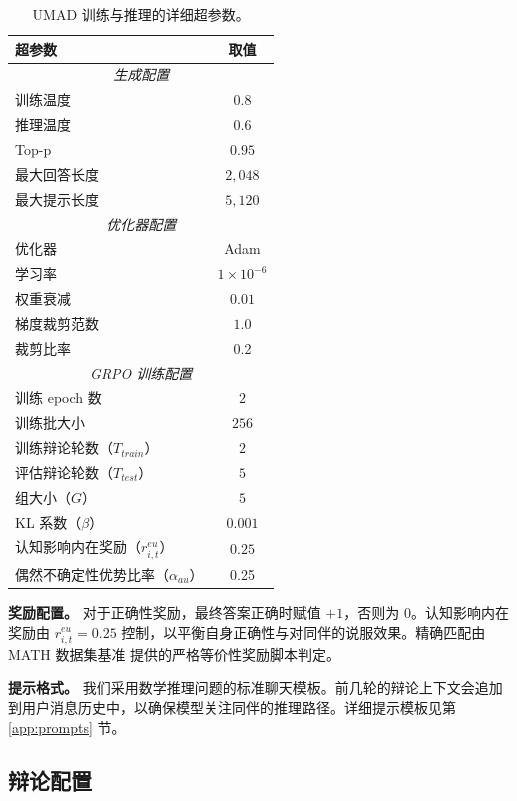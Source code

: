 \documentclass{article}
\theoremstyle{plain}
\theoremstyle{definition}
\theoremstyle{remark}
\begin{document}
\begin{table}[h]
\centering
\caption{UMAD 训练与推理的详细超参数。}
\label{tab:hyperparameters}
\begin{small}
\begin{tabular}{l|c}
\toprule
\textbf{超参数} & \textbf{取值} \\
\midrule
\multicolumn{2}{c}{\textit{生成配置}} \\
\midrule
训练温度 & $0.8$ \\
推理温度 & $0.6$ \\
Top-p & $0.95$ \\
最大回答长度 & $2,048$ \\
最大提示长度 & $5,120$ \\
\midrule
\multicolumn{2}{c}{\textit{优化器配置}} \\
\midrule
优化器 & Adam \\
学习率 & $1 \times 10^{-6}$ \\
权重衰减 & $0.01$ \\
梯度裁剪范数 & $1.0$ \\
裁剪比率 & 0.2 \\
\midrule
\multicolumn{2}{c}{\textit{GRPO 训练配置}} \\
\midrule
训练 epoch 数 & $2$ \\
训练批大小 & $256$ \\
训练辩论轮数（$T_{train}$） & $2$ \\
评估辩论轮数（$T_{test}$） & $5$ \\
组大小（$G$） & $5$ \\
KL 系数（$\beta$） & $0.001$ \\
认知影响内在奖励（$r_{i,t}^{eu}$） & $0.25$ \\
偶然不确定性优势比率（$\alpha_{au}$） & 0.25 \\
\bottomrule
\end{tabular}
\end{small}
\end{table}

\textbf{奖励配置。}
对于正确性奖励，最终答案正确时赋值 $+1$，否则为 $0$。认知影响内在奖励由 $r_{i,t}^{eu}=0.25$ 控制，以平衡自身正确性与对同伴的说服效果。精确匹配由 MATH 数据集基准 \cite{hendrycks2021measuring} 提供的严格等价性奖励脚本判定。

\textbf{提示格式。}
我们采用数学推理问题的标准聊天模板。前几轮的辩论上下文会追加到用户消息历史中，以确保模型关注同伴的推理路径。详细提示模板见第 \ref{app:prompts} 节。




\subsection{辩论配置}
\end{document}
